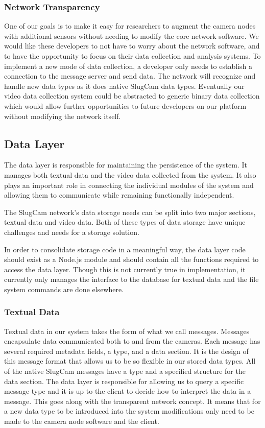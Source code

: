 \subsubsection{Network Transparency}

One of our goals is to make it easy for researchers to augment the camera nodes
with additional sensors without needing to modify the core network software. We
would like these developers to not have to worry about the network software, and
to have the opportunity to focus on their data collection and analysis systems.
To implement a new mode of data collection, a developer only needs to establish
a connection to the message server and send data. The network will recognize and
handle new data types as it does native SlugCam data types. Eventually our video
data collection system could be abstracted to generic binary data collection
which would allow further opportunities to future developers on our platform
without modifying the network itself.

\subsection{Data Layer}

The data layer is responsible for maintaining the persistence of the system. It
manages both textual data and the video data collected from the system. It also
plays an important role in connecting the individual modules of the system and
allowing them to communicate while remaining functionally independent.

The SlugCam network's data storage needs can be split into two major sections,
textual data and video data. Both of these types of data storage have unique
challenges and needs for a storage solution.

In order to consolidate storage code in a meaningful way, the data layer code
should exist as a Node.js module and should contain all the functions required
to access the data layer. Though this is not currently true in implementation,
it currently only manages the interface to the database for textual data and the
file system commands are done elsewhere.

\subsubsection{Textual Data}

Textual data in our system takes the form of what we call messages. Messages
encapsulate data communicated both to and from the cameras. Each message has
several required metadata fields, a type, and a data section. It is the design
of this message format that allows us to be so flexible in our stored data
types. All of the native SlugCam messages have a type and a specified structure
for the data section. The data layer is responsible for allowing us to query a
specific message type and it is up to the client to decide how to interpret the
data in a message. This goes along with the transparent network concept. It
means that for a new data type to be introduced into the system modifications
only need to be made to the camera node software and the client.

